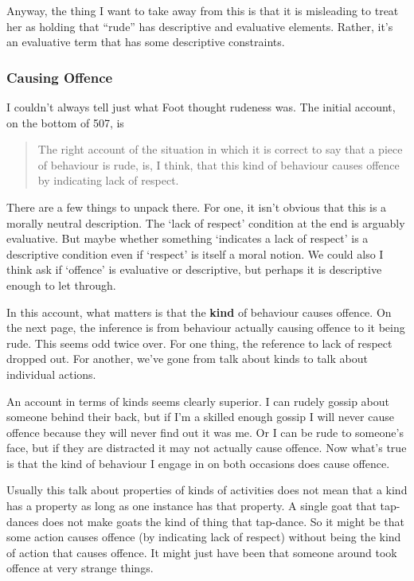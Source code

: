 \documentclass[
]{article}
\begin{document}
Anyway, the thing I want to take away from this is that it is misleading
to treat her as holding that ``rude'' has descriptive and evaluative
elements. Rather, it's an evaluative term that has some descriptive
constraints.

\hypertarget{causing-offence}{%
\subsubsection{Causing Offence}\label{causing-offence}}

I couldn't always tell just what Foot thought rudeness was. The initial
account, on the bottom of 507, is

\begin{quote}
The right account of the situation in which it is correct to say that a
piece of behaviour is rude, is, I think, that this kind of behaviour
causes offence by indicating lack of respect.
\end{quote}

There are a few things to unpack there. For one, it isn't obvious that
this is a morally neutral description. The `lack of respect' condition
at the end is arguably evaluative. But maybe whether something
`indicates a lack of respect' is a descriptive condition even if
`respect' is itself a moral notion. We could also I think ask if
`offence' is evaluative or descriptive, but perhaps it is descriptive
enough to let through.

In this account, what matters is that the \textbf{kind} of behaviour
causes offence. On the next page, the inference is from behaviour
actually causing offence to it being rude. This seems odd twice over.
For one thing, the reference to lack of respect dropped out. For
another, we've gone from talk about kinds to talk about individual
actions.

An account in terms of kinds seems clearly superior. I can rudely gossip
about someone behind their back, but if I'm a skilled enough gossip I
will never cause offence because they will never find out it was me. Or
I can be rude to someone's face, but if they are distracted it may not
actually cause offence. Now what's true is that the kind of behaviour I
engage in on both occasions does cause offence.

Usually this talk about properties of kinds of activities does not mean
that a kind has a property as long as one instance has that property. A
single goat that tap-dances does not make goats the kind of thing that
tap-dance. So it might be that some action causes offence (by indicating
lack of respect) without being the kind of action that causes offence.
It might just have been that someone around took offence at very strange
things.
\end{document}
